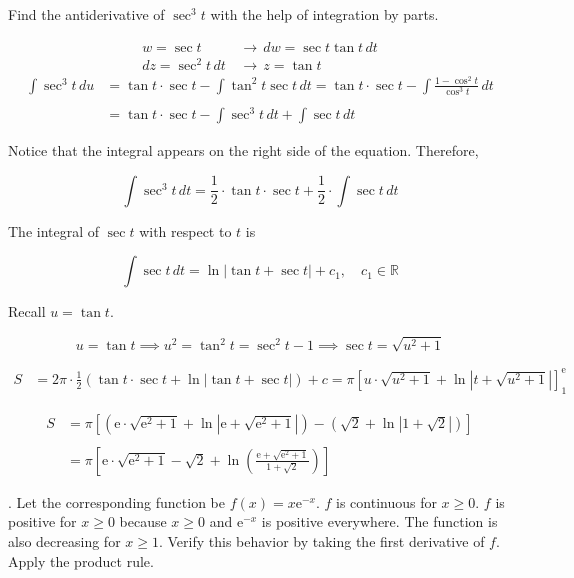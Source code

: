 \documentclass{article}
\begin{document}
\hfill

\noindent Find the antiderivative of $\sec^3t$ with the help of integration by parts.

\begin{align*}
    w=\sec t\,&\rightarrow\, dw = \sec t\tan t \,dt\\
    dz=\sec^2t\,dt\,&\rightarrow\, z = \tan t
\end{align*}
\begin{align*}
\int\sec^3t\,du&=\tan t\cdot\sec t-\int\tan^2 t\sec t\,dt=\tan t\cdot\sec t-\int\frac{1-\cos^2t}{\cos^3 t}\,dt\\\\&=\tan t\cdot\sec t-\int\sec^3t\,dt+\int\sec t\,dt 
\end{align*}

\hfill

\noindent Notice that the integral appears on the right side of the equation. Therefore,

\[\int\sec^3t\,dt=\frac12\cdot\tan t\cdot\sec t+\frac12\cdot\int\sec t\,dt\]

\hfill

\noindent The integral of $\sec t$ with respect to $t$ is

\[\int\sec t\,dt=\ln\left|\tan t+\sec t\right|+c_1,\quad c_1\in\mathbb{R}\]

\hfill

\noindent Recall $u=\tan t$.

\[u=\tan t\implies u^2=\tan^2t=\sec^2t-1\implies \sec t=\sqrt{u^2+1}\]

\begin{align*}S&=2\pi\cdot\frac12\left(\tan t\cdot\sec t+\ln\left|\tan t+\sec t\right|\right)+c=\pi\left[u\cdot\sqrt{u^2+1}+\ln\left|t+\sqrt{u^2+1}\right|\right]_1^{\mathrm{e}}\end{align*}

\begin{align*}S&=\pi\left[\left(\mathrm{e}\cdot\sqrt{\mathrm{e}^2+1}+\ln\left|\mathrm{e}+\sqrt{\mathrm{e}^2+1}\right|\right)-\left(\sqrt2+\ln\left|1+\sqrt2\right|\right)\right]\\\\&=\boxed{\pi\left[\mathrm{e}\cdot\sqrt{\mathrm{e}^2+1}-\sqrt2+\ln\left(\frac{\mathrm{e}+\sqrt{\mathrm{e}^2+1}}{1+\sqrt2}\right)\right]}\end{align*}

\hfill

. Let the corresponding function be $f(x)=x\mathrm{e}^{-x}$. $f$ is continuous for $x\geq0$. $f$ is positive for $x\geq0$ because $x\geq 0$ and $\mathrm{e}^{-x}$ is positive everywhere. The function is also decreasing for $x\geq1$. Verify this behavior by taking the first derivative of $f$. Apply the product rule.
\end{document}
